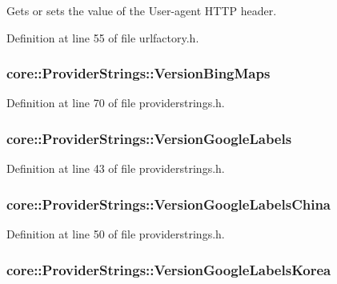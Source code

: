 Gets or sets the value of the User-\/agent H\-T\-T\-P header. 



Definition at line 55 of file urlfactory.\-h.

\hypertarget{group___o_p_map_widget_ga98d1eeb119258d3fb9fab1a550604eb0}{
\subsubsection[{Version\-Bing\-Maps}]{ core\-::\-Provider\-Strings\-::\-Version\-Bing\-Maps}}\label{group___o_p_map_widget_ga98d1eeb119258d3fb9fab1a550604eb0}


Definition at line 70 of file providerstrings.\-h.

\hypertarget{group___o_p_map_widget_gaa55f03ddecd8e241164698587988c456}{
\subsubsection[{Version\-Google\-Labels}]{ core\-::\-Provider\-Strings\-::\-Version\-Google\-Labels}}\label{group___o_p_map_widget_gaa55f03ddecd8e241164698587988c456}


Definition at line 43 of file providerstrings.\-h.

\hypertarget{group___o_p_map_widget_ga702737218086c22a41d6dfaeb6092644}{
\subsubsection[{Version\-Google\-Labels\-China}]{ core\-::\-Provider\-Strings\-::\-Version\-Google\-Labels\-China}}\label{group___o_p_map_widget_ga702737218086c22a41d6dfaeb6092644}


Definition at line 50 of file providerstrings.\-h.

\hypertarget{group___o_p_map_widget_ga4f4a5781537c7ee429695a130c8ccbdb}{
\subsubsection[{Version\-Google\-Labels\-Korea}]{ core\-::\-Provider\-Strings\-::\-Version\-Google\-Labels\-Korea}}\label{group___o_p_map_widget_ga4f4a5781537c7ee429695a130c8ccbdb}


